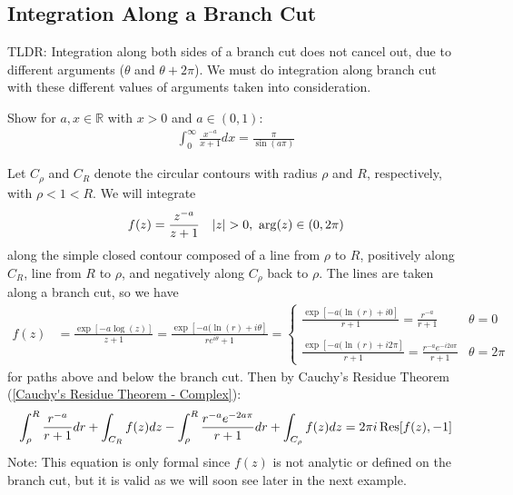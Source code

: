 \documentclass[12pt, english]{book}
\makeatletter
\renewenvironment{proof}[1][\proofname]{\par
	\pushQED{\qed}%
	\normalfont \topsep6\p@\@plus6\p@\relax
	\list{}{%
		\settowidth{\leftmargin}{\itshape\proofname:\hskip\labelsep}%
		\setlength{\labelwidth}{0pt}%
		\setlength{\itemindent}{-\leftmargin}%
	}%
	\item[\hskip\labelsep\itshape#1\@addpunct{:}]\ignorespaces
}{%
	\popQED\endlist\@endpefalse
}
\makeatother
\begin{document}
	\subsection{Integration Along a Branch Cut} \label{Integration Along a Branch Cut Subsection - Complex}
	
	TLDR: Integration along both sides of a branch cut does not cancel out, due to different arguments (\(\theta\) and \(\theta + 2\pi\)). We must do integration along branch cut with these different values of arguments taken into consideration.
	
	\begin{example}
		Show for \(a, x \in \mathbb{R}\) with \(x > 0\) and \(a \in (0,1)\):
		\begin{align*}
			\int_{0}^{\infty} \frac{x^{-a}}{x+1} dx = \frac{\pi}{\sin(a\pi)}
		\end{align*}
		\begin{proof}
			Let \(C_\rho\) and \(C_R\) denote the circular contours with radius \(\rho\) and \(R\), respectively, with \(\rho < 1  < R\). We will integrate
			\begin{align*}
				f(z) &= \frac{z^{-a}}{z+1} & \abs{z}>0, \ \arg(z) \in (0, 2\pi)
			\end{align*}
			along the simple closed contour composed of a line from \(\rho\) to \(R\), positively along \(C_R\), line from \(R\) to \(\rho\), and negatively along \(C_\rho\) back to \(\rho\). The lines are taken along a branch cut, so we have 
			\begin{align*}
				f(z) 
				&= \frac{\exp[-a \log(z)]}{z+1} = \frac{\exp[-a (\ln(r) + i\theta]}{re^{i\theta} + 1} 
				= 
				\begin{cases} \displaystyle
					\frac{\exp[-a(\ln(r) + i0]}{r + 1} = \frac{r^{-a}}{r+1} & \theta = 0 \\ \\
					\displaystyle
					\frac{\exp[-a(\ln(r) + i2\pi]}{r + 1} = \frac{r^{-a}e^{-i2a\pi}}{r+1} & \theta = 2\pi
				\end{cases}
			\end{align*}
			for paths above and below the branch cut. Then by Cauchy's Residue Theorem (\cref{Cauchy's Residue Theorem - Complex}):
			\begin{align*}
				\int_{\rho}^{R} \frac{r^{-a}}{r+1} dr 
				+ \int_{C_R} f(z) dz 
				- \int_{\rho}^{R} \frac{r^{-a} e^{-2a\pi}}{r+1} dr
				+ \int_{C_\rho} f(z) dz 
				= 2\pi i \Res[f(z), -1]
			\end{align*}
			Note: This equation is only formal since \(f(z)\) is not analytic or defined on the branch cut, but it is valid as we will soon see later in the next example.

\end{proof}
\end{example}
\end{document}
